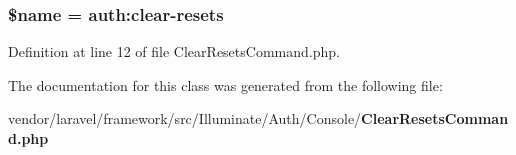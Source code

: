 \subsubsection[{\$name}]{\setlength{\rightskip}{0pt plus 5cm}\${\bf name} = \textquotesingle{}auth\+:clear-\/resets\textquotesingle{}\hspace{0.3cm}{\ttfamily [protected]}}\label{class_illuminate_1_1_auth_1_1_console_1_1_clear_resets_command_ab2fc40d43824ea3e1ce5d86dee0d763b}


Definition at line 12 of file Clear\+Resets\+Command.\+php.



The documentation for this class was generated from the following file\+:\begin{DoxyCompactItemize}
\item 
vendor/laravel/framework/src/\+Illuminate/\+Auth/\+Console/{\bf Clear\+Resets\+Command.\+php}\end{DoxyCompactItemize}
